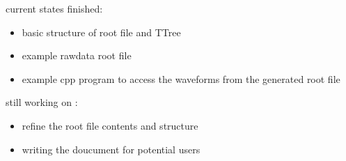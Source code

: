 \begin{frame}{ current states}
finished:
\begin{itemize}
\item basic structure of root file and TTree
\item example rawdata root file
\item example cpp program to access the waveforms from the generated root file
\end{itemize}
still working on :
\begin{itemize}
\item refine the root file contents and structure
\item writing the doucument for potential users
\end{itemize}
 
\end{frame}
%
%
